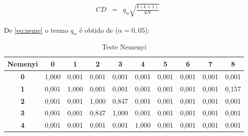    \begin{eqnarray}
    	C D&=&q_\alpha \sqrt{\frac{k(k+1)}{6 N}}\label{eq:neme}
    \end{eqnarray}

De \eqref{eq:neme} o termo $q_\alpha$ é obtido de ($\alpha=0,05$):

\begin{table}[H]
	\centering
	\caption{Teste Nemenyi}
	\begin{tabular}{@{}clllllllll@{}}
		\toprule
		\multicolumn{1}{l}{\textbf{Nemenyi}} & \multicolumn{1}{c}{\textbf{0}} & \multicolumn{1}{c}{\textbf{1}} & \multicolumn{1}{c}{\textbf{2}} & \multicolumn{1}{c}{\textbf{3}} & \multicolumn{1}{c}{\textbf{4}} & \multicolumn{1}{c}{\textbf{5}} & \multicolumn{1}{c}{\textbf{6}} & \multicolumn{1}{c}{\textbf{7}} & \multicolumn{1}{c}{\textbf{8}} \\ \midrule
		\textbf{0}                           & 1,000                          & 0,001                          & 0,001                          & 0,001                          & 0,001                          & 0,001                          & 0,001                          & 0,001                          & 0,001                          \\
		\textbf{1}                           & 0,001                          & 1,000                          & 0,001                          & 0,001                          & 0,001                          & 0,001                          & 0,001                          & 0,001                          & 0,157                          \\
		\textbf{2}                           & 0,001                          & 0,001                          & 1,000                          & 0,847                          & 0,001                          & 0,001                          & 0,001                          & 0,001                          & 0,001                          \\
		\textbf{3}                           & 0,001                          & 0,001                          & 0,847                          & 1,000                          & 0,001                          & 0,001                          & 0,001                          & 0,001                          & 0,001                          \\
		\textbf{4}                           & 0,001                          & 0,001                          & 0,001                          & 0,001                          & 1,000                          & 0,001                          & 0,001                          & 0,001                          & 0,001                          \\

\end{tabular}
\end{table}
